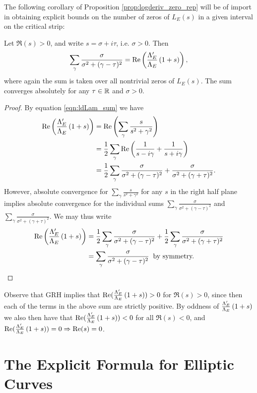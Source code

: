 The following corollary of Proposition \ref{prop:logderiv_zero_rep} will be of import in obtaining explicit bounds on the number of zeros of $L_E(s)$ in a given interval on the critical strip:
\begin{corollary}[GRH]\label{cor:Re_logderiv}
Let $\Re(s) > 0$, and write $s = \sigma + i\tau$, i.e. $\sigma > 0$. Then
\begin{equation}
\sum_{\gamma} \frac{\sigma}{\sigma^2+(\gamma-\tau)^2} = \mbox{\rm Re}\left(\frac{\Lambda_E^{\prime}}{\Lambda_E}\left(1+s\right)\right),
\end{equation}
where again the sum is taken over all nontrivial zeros of $L_E(s)$. The sum converges absolutely for any $\tau \in \mathbb{R}$ and $\sigma > 0$.
\end{corollary}
\begin{proof}
By equation \ref{eqn:ldLam_sum} we have
\begin{align*}
\mbox{\rm Re}\left(\frac{\Lambda_E^{\prime}}{\Lambda_E}\left(1+s\right)\right) &= \mbox{\rm Re}\left(\sum_{\gamma} \frac{s}{s^2+\gamma^2}\right) \\
& = \frac{1}{2} \sum_{\gamma} \mbox{\rm Re}\left(\frac{1}{s - i \gamma} + \frac{1}{s + i \gamma}\right) \\
&= \frac{1}{2} \sum_{\gamma} \frac{\sigma}{\sigma^2+(\gamma-\tau)^2} +  \frac{\sigma}{\sigma^2+(\gamma+\tau)^2}.
\end{align*}
However, absolute convergence for $\sum_{\gamma} \frac{s}{s^2+\gamma^2}$ for any $s$ in the right half plane implies absolute convergence for the individual sums $\sum_{\gamma} \frac{\sigma}{\sigma^2+(\gamma-\tau)^2}$ and $\sum_{\gamma} \frac{\sigma}{\sigma^2+(\gamma+\tau)^2}$. We may thus write
\begin{align*}
\mbox{\rm Re}\left(\frac{\Lambda_E^{\prime}}{\Lambda_E}\left(1+s\right)\right) &= \frac{1}{2} \sum_{\gamma} \frac{\sigma}{\sigma^2+(\gamma-\tau)^2} +  \frac{1}{2} \sum_{\gamma}\frac{\sigma}{\sigma^2+(\gamma+\tau)^2} \\
&= \sum_{\gamma} \frac{\sigma}{\sigma^2+(\gamma-\tau)^2} \;\;\text{by symmetry.}
\end{align*}
\end{proof}
Observe that GRH implies that $\mbox{\rm Re}(\frac{\Lambda_E^{\prime}}{\Lambda_E}\left(1+s\right))>0$ for $\Re(s)>0$, since then each of the terms in the above sum are strictly positive. By oddness of $\frac{\Lambda_E^{\prime}}{\Lambda_E}\left(1+s\right)$ we also then have that $\mbox{\rm Re}(\frac{\Lambda_E^{\prime}}{\Lambda_E}\left(1+s\right))<0$ for all $\Re(s)<0$, and $\mbox{\rm Re}(\frac{\Lambda_E^{\prime}}{\Lambda_E}\left(1+s\right))=0 \Rightarrow \mbox{\rm Re}(s)=0$. \\

\newpage
\section{The Explicit Formula for Elliptic Curves}

